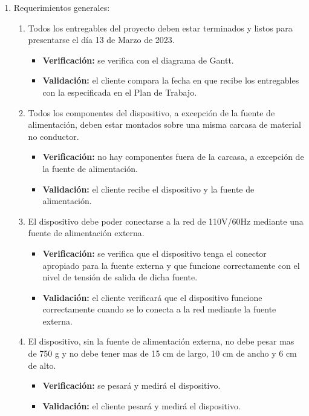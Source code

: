 \documentclass[
11pt, %
]{charter}
\begin{document}
\begin{enumerate}

\item Requerimientos generales:
\begin{enumerate}
\item Todos los entregables del proyecto deben estar terminados y listos para presentarse el día 13 de Marzo de 2023.
\begin{itemize}
	\item \textbf{Verificación:} se verifica con el diagrama de Gantt.
	\item \textbf{Validación:} el cliente compara la fecha en que recibe los entregables con la especificada en el Plan de Trabajo.
\end{itemize}

\item Todos los componentes del dispositivo, a excepción de la fuente de alimentación, deben estar montados sobre una misma carcasa de material no conductor.
\begin{itemize}
	\item \textbf{Verificación:} no hay componentes fuera de la carcasa, a excepción de la fuente de alimentación.
	\item \textbf{Validación:} el cliente recibe el dispositivo y la fuente de alimentación.
\end{itemize}

\item El dispositivo debe poder conectarse a la red de 110V/60Hz mediante una fuente de alimentación externa.
\begin{itemize}
	\item \textbf{Verificación:} se verifica que el dispositivo tenga el conector apropiado para la fuente externa y que funcione correctamente con el nivel de tensión de salida de dicha fuente.
	\item \textbf{Validación:} el cliente verificará que el dispositivo funcione correctamente cuando se lo conecta a la red mediante la fuente externa.
\end{itemize}

\item El dispositivo, sin la fuente de alimentación externa, no debe pesar mas de 750 g y no debe tener mas de 15 cm de largo, 10 cm de ancho y 6 cm de alto.
\begin{itemize}
	\item \textbf{Verificación:} se pesará y medirá el dispositivo.
	\item \textbf{Validación:} el cliente pesará y medirá el dispositivo.
\end{itemize}


\end{enumerate}
\end{enumerate}
\end{document}
